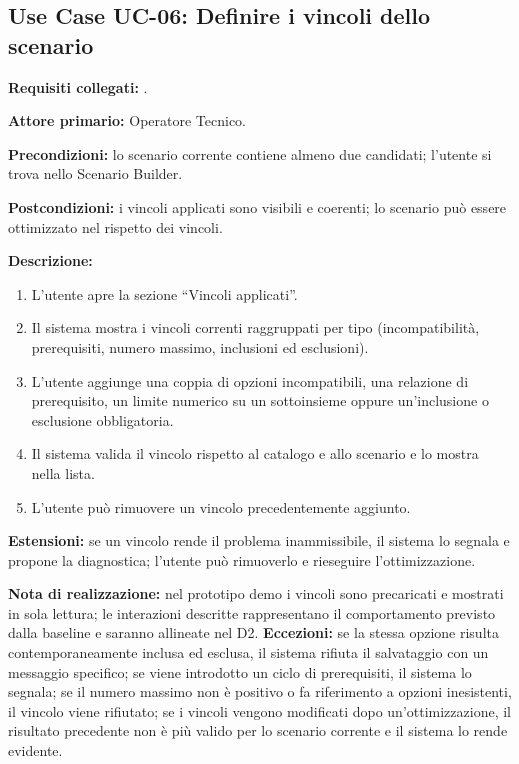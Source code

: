 \subsection*{Use Case UC-06: Definire i vincoli dello scenario}
\textbf{Requisiti collegati:} .\par
\textbf{Attore primario:} Operatore Tecnico.\par
\textbf{Precondizioni:} lo scenario corrente contiene almeno due candidati; l'utente si trova nello Scenario Builder.\par
\textbf{Postcondizioni:} i vincoli applicati sono visibili e coerenti; lo scenario può essere ottimizzato nel rispetto dei vincoli.\par
\textbf{Descrizione:}
\begin{enumerate}[leftmargin=1.6em, itemsep=0.1em]
    \item L'utente apre la sezione ``Vincoli applicati''.
    \item Il sistema mostra i vincoli correnti raggruppati per tipo (incompatibilità, prerequisiti, numero massimo, inclusioni ed esclusioni).
    \item L'utente aggiunge una coppia di opzioni incompatibili, una relazione di prerequisito, un limite numerico su un sottoinsieme oppure un'inclusione o esclusione obbligatoria.
    \item Il sistema valida il vincolo rispetto al catalogo e allo scenario e lo mostra nella lista.
    \item L'utente può rimuovere un vincolo precedentemente aggiunto.
\end{enumerate}
\textbf{Estensioni:} se un vincolo rende il problema inammissibile, il sistema lo segnala e propone la diagnostica; l'utente può rimuoverlo e rieseguire l'ottimizzazione.\par
\textbf{Nota di realizzazione:} nel prototipo demo i vincoli sono precaricati e mostrati in sola lettura; le interazioni descritte rappresentano il comportamento previsto dalla baseline e saranno allineate nel D2.
\textbf{Eccezioni:} se la stessa opzione risulta contemporaneamente inclusa ed esclusa, il sistema rifiuta il salvataggio con un messaggio specifico; se viene introdotto un ciclo di prerequisiti, il sistema lo segnala; se il numero massimo non è positivo o fa riferimento a opzioni inesistenti, il vincolo viene rifiutato; se i vincoli vengono modificati dopo un'ottimizzazione, il risultato precedente non è più valido per lo scenario corrente e il sistema lo rende evidente.

